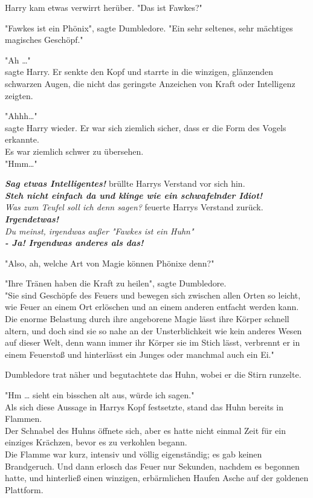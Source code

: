 {Harry kam etwas verwirrt herüber. "Das ist Fawkes?"

"Fawkes ist ein Phönix", sagte Dumbledore. "Ein sehr seltenes, sehr mächtiges magisches Geschöpf."

"Ah …"\\ sagte Harry. Er senkte den Kopf und starrte in die winzigen, glänzenden schwarzen Augen, die nicht das geringste Anzeichen von Kraft oder Intelligenz zeigten.

"Ahhh…"\\ sagte Harry wieder. Er war sich ziemlich sicher, dass er die Form des Vogels erkannte.\\ Es war ziemlich schwer zu übersehen.\\ "Hmm…"

\textbf{\emph{Sag etwas Intelligentes!}} brüllte Harrys Verstand vor sich hin.\\ \textbf{\emph{Steh nicht einfach da und klinge wie ein schwafelnder Idiot!}}\\ \emph{Was zum Teufel soll ich denn sagen?} feuerte Harrys Verstand zurück.\\ \textbf{\emph{Irgendetwas!}}\\ \emph{Du meinst, irgendwas außer "Fawkes ist ein Huhn"}\\ \textbf{\emph{- Ja! Irgendwas anderes als das!}}

"Also, ah, welche Art von Magie können Phönixe denn?"

"Ihre Tränen haben die Kraft zu heilen", sagte Dumbledore.\\ "Sie sind Geschöpfe des Feuers und bewegen sich zwischen allen Orten so leicht, wie Feuer an einem Ort erlöschen und an einem anderen entfacht werden kann.\\ Die enorme Belastung durch ihre angeborene Magie lässt ihre Körper schnell altern, und doch sind sie so nahe an der Unsterblichkeit wie kein anderes Wesen auf dieser Welt, denn wann immer ihr Körper sie im Stich lässt, verbrennt er in einem Feuerstoß und hinterlässt ein Junges oder manchmal auch ein Ei."

Dumbledore trat näher und begutachtete das Huhn, wobei er die Stirn runzelte.

"Hm … sieht ein bisschen alt aus, würde ich sagen."\\ Als sich diese Aussage in Harrys Kopf festsetzte, stand das Huhn bereits in Flammen.\\ Der Schnabel des Huhns öffnete sich, aber es hatte nicht einmal Zeit für ein einziges Krächzen, bevor es zu verkohlen begann.\\ Die Flamme war kurz, intensiv und völlig eigenständig; es gab keinen Brandgeruch. Und dann erlosch das Feuer nur Sekunden, nachdem es begonnen hatte, und hinterließ einen winzigen, erbärmlichen Haufen Asche auf der goldenen Plattform.

}
